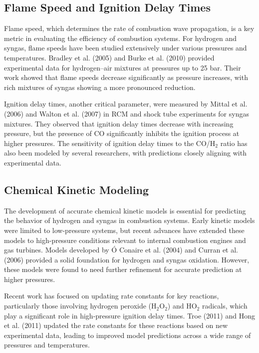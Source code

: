 \documentclass[12pt]{report}
\begin{document}
\subsection{Flame Speed and Ignition Delay Times}
Flame speed, which determines the rate of combustion wave propagation, is a key metric in evaluating the efficiency of combustion systems. For hydrogen and syngas, flame speeds have been studied extensively under various pressures and temperatures. Bradley et al. (2005) and Burke et al. (2010) provided experimental data for hydrogen–air mixtures at pressures up to 25 bar. Their work showed that flame speeds decrease significantly as pressure increases, with rich mixtures of syngas showing a more pronounced reduction.

Ignition delay times, another critical parameter, were measured by Mittal et al. (2006) and Walton et al. (2007) in RCM and shock tube experiments for syngas mixtures. They observed that ignition delay times decrease with increasing pressure, but the presence of CO significantly inhibits the ignition process at higher pressures. The sensitivity of ignition delay times to the CO/H$_2$ ratio has also been modeled by several researchers, with predictions closely aligning with experimental data.

\subsection{Chemical Kinetic Modeling}
The development of accurate chemical kinetic models is essential for predicting the behavior of hydrogen and syngas in combustion systems. Early kinetic models were limited to low-pressure systems, but recent advances have extended these models to high-pressure conditions relevant to internal combustion engines and gas turbines. Models developed by Ó Conaire et al. (2004) and Curran et al. (2006) provided a solid foundation for hydrogen and syngas oxidation. However, these models were found to need further refinement for accurate prediction at higher pressures.

Recent work has focused on updating rate constants for key reactions, particularly those involving hydrogen peroxide (H$_2$O$_2$) and HO$_2$ radicals, which play a significant role in high-pressure ignition delay times. Troe (2011) and Hong et al. (2011) updated the rate constants for these reactions based on new experimental data, leading to improved model predictions across a wide range of pressures and temperatures.
\end{document}
